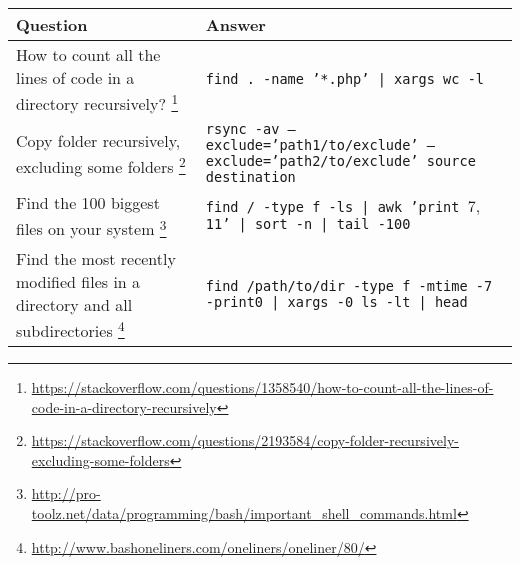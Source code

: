 \begin{center}
\begin{tabular}{p{3in}p{3in}}
    \textbf{Question} & \textbf{Answer} \\
    \hline \hline
    How to count all the lines of code in a directory recursively?%
        \footnote{\url{https://stackoverflow.com/questions/1358540/how-to-count-all-the-lines-of-code-in-a-directory-recursively}} &
        \texttt{find . -name '*.php' | xargs wc -l} \\
    \hline
    Copy folder recursively, excluding some folders%
        \footnote{\url{https://stackoverflow.com/questions/2193584/copy-folder-recursively-excluding-some-folders}} &
        \texttt{rsync -av --exclude='path1/to/exclude' --exclude='path2/to/exclude' source destination} \\
     \hline
     Find the 100 biggest files on your system%
         \footnote{\url{http://pro-toolz.net/data/programming/bash/important_shell_commands.html}}&
         \texttt{find / -type f -ls | awk '{print $7,$11}' | sort -n | tail -100} \\
     \hline
     Find the most recently modified files in a directory and all subdirectories%
         \footnote{\url{http://www.bashoneliners.com/oneliners/oneliner/80/}}&
         \texttt{find /path/to/dir -type f -mtime -7 -print0 | xargs -0 ls -lt | head} \\
\end{tabular}
\end{center}


